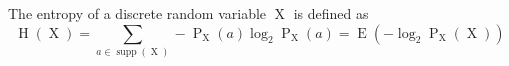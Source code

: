 The entropy of a discrete random variable $\operatorname{X}$ is defined as
$$\operatorname{H}(\operatorname{X}) = \sum\limits_{a \in \operatorname{supp}(\operatorname{X})} - \operatorname{P}_{\operatorname{X}}(a) \log_2 \operatorname{P}_{\operatorname{X}}(a) = \operatorname{E}(- \log_2 \operatorname{P}_{\operatorname{X}}(\operatorname{X}))$$
